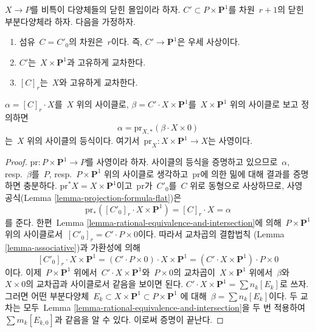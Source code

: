 \begin{lemma}
\label{lemma-transfer}
$X \to P$를 비특이 다양체들의 닫힌 몰입이라 하자.
$C' \subset P \times \mathbf{P}^1$를 차원\  $r + 1$의 닫힌 부분다양체라 하자.
다음을 가정하자.
\begin{enumerate}
\item 섬유\  $C = C'_0$의 차원은\  $r$이다. 즉,
$C' \to \mathbf{P}^1$은 우세 사상이다.
\item $C'$는\  $X \times \mathbf{P}^1$과 고유하게 교차한다.
\item $[C]_r$는\  $X$와 고유하게 교차한다.
\end{enumerate}
$\alpha = [C]_r \cdot X$를\  $X$ 위의 사이클로,
$\beta = C' \cdot X \times \mathbf{P}^1$를\ 
$X \times \mathbf{P}^1$ 위의 사이클로 보고 정의하면
$$
\alpha = \text{pr}_{X, *}(\beta \cdot X \times 0)
$$
는\  $X$ 위의 사이클의 등식이다. 여기서\ 
$\text{pr}_X : X \times \mathbf{P}^1 \to X$는 사영이다.
\end{lemma}

\begin{proof}
$\text{pr} : P \times \mathbf{P}^1 \to P$를 사영이라 하자.
사이클의 등식을 증명하고 있으므로\  $\alpha$, resp.\ $\beta$를\ 
$P$, resp.\ $P \times \mathbf{P}^1$ 위의 사이클로 생각하고\ 
$\text{pr}$에 의한 밂에 대해 결과를 증명하면 충분하다.
$\text{pr}^*X = X \times \mathbf{P}^1$이고\  $\text{pr}$가\  $C'_0$를\  $C$ 위로
동형으로 사상하므로, 사영 공식(Lemma \ref{lemma-projection-formula-flat})은
$$
\text{pr}_*([C'_0]_r \cdot X \times \mathbf{P}^1) = [C]_r \cdot X = \alpha
$$
를 준다. 한편\  Lemma \ref{lemma-rational-equivalence-and-intersection}에 의해\ 
$P \times \mathbf{P}^1$ 위의 사이클로서\ 
$[C'_0]_r = C' \cdot P \times 0$이다. 따라서 교차곱의 결합법칙
(Lemma \ref{lemma-associative})과 가환성에 의해
$$
[C'_0]_r \cdot X \times \mathbf{P}^1 =
(C' \cdot P \times 0) \cdot X \times \mathbf{P}^1 =
(C' \cdot X \times \mathbf{P}^1) \cdot P \times 0
$$
이다. 이제\  $P \times \mathbf{P}^1$ 위에서\ 
$C' \cdot X \times \mathbf{P}^1$와\  $P \times 0$의 교차곱이\ 
$X \times \mathbf{P}^1$ 위에서\  $\beta$와\  $X \times 0$의 교차곱과
사이클로서 같음을 보이면 된다.
$C' \cdot X \times \mathbf{P}^1 = \sum n_k[E_k]$로 쓰자. 그러면 어떤
부분다양체\  $E_k \subset X \times \mathbf{P}^1 \subset P \times \mathbf{P}^1$
에 대해\  $\beta = \sum n_k[E_k]$이다. 두 교차는 모두\ 
Lemma \ref{lemma-rational-equivalence-and-intersection}을 두 번 적용하여\ 
$\sum m_k[E_{k, 0}]$과 같음을 알 수 있다. 이로써 증명이 끝난다.
\end{proof}




